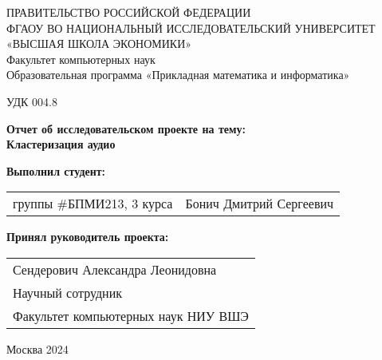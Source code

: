 \begin{titlepage}
\newpage

{
\begin{center}
ПРАВИТЕЛЬСТВО РОССИЙСКОЙ ФЕДЕРАЦИИ\\
ФГАОУ ВО НАЦИОНАЛЬНЫЙ ИССЛЕДОВАТЕЛЬСКИЙ УНИВЕРСИТЕТ\\
«ВЫСШАЯ ШКОЛА ЭКОНОМИКИ»
\\
\bigskip
Факультет компьютерных наук\\
Образовательная программа «Прикладная математика и информатика»
\end{center}
}

\vspace{2em}
УДК 004.8 %
\vspace{5em}

\begin{center}
{\bf Отчет об исследовательском проекте на тему:}\\
{\bf Кластеризация аудио}\\
\end{center}

\vspace{2em}

{\bf Выполнил студент: \vspace{2mm}}

{
\begin{tabular}{l@{\hskip 1.5cm}l}
группы \#БПМИ213, 3 курса & Бонич Дмитрий Сергеевич 
\end{tabular}}

\vspace{1em}
{\bf Принял руководитель проекта: \vspace{2mm}}

{
\begin{tabular}{l}
Сендерович Александра Леонидовна\\
Научный сотрудник\\
Факультет компьютерных наук НИУ ВШЭ 
\end{tabular}}

\vspace{\fill}

\begin{center}
Москва 2024
\end{center}

\end{titlepage}
